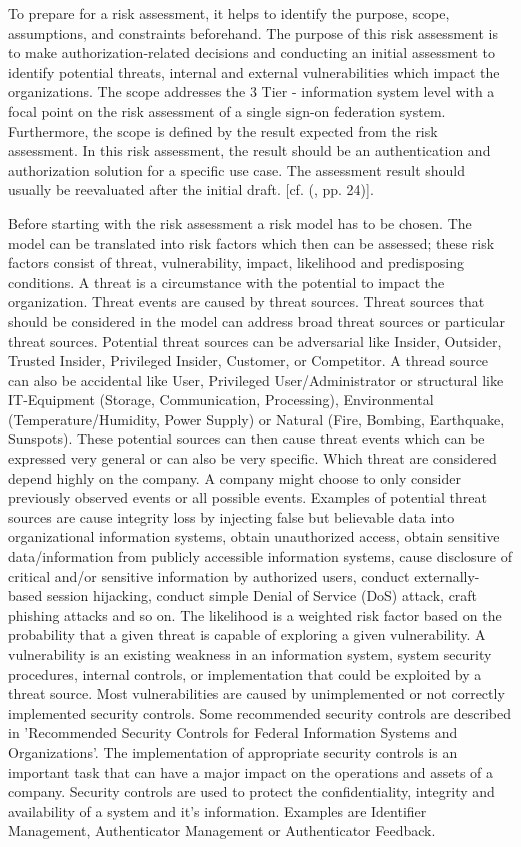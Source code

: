 To prepare for a risk assessment, it helps to identify the purpose, scope, assumptions, and constraints beforehand. The purpose of this risk assessment is to make authorization-related decisions and conducting an initial assessment to identify potential threats, internal and external vulnerabilities which impact the organizations. The scope addresses the 3 Tier -  information system level with a focal point on the risk assessment of a single sign-on federation system. Furthermore, the scope is defined by the result expected from the risk assessment. In this risk assessment, the result should be an authentication and authorization solution for a specific use case. The assessment result should usually be reevaluated after the initial draft. [cf. (\cite{NIST:2012:GCRA}, pp. 24)].

Before starting with the risk assessment a risk model has to be chosen. The model can be translated into risk factors which then can be assessed; these risk factors consist of threat, vulnerability, impact, likelihood and predisposing conditions.  A threat is a circumstance with the potential to impact the organization. Threat events are caused by threat sources. Threat sources that should be considered in the model can address broad threat sources or particular threat sources. Potential threat sources can be adversarial like Insider, Outsider, Trusted Insider, Privileged Insider, Customer, or Competitor. A thread source can also be accidental like User, Privileged User/Administrator or structural like IT-Equipment (Storage, Communication, Processing), Environmental (Temperature/Humidity, Power Supply) or Natural (Fire, Bombing, Earthquake, Sunspots). These potential sources can then cause threat events which can be expressed very general or can also be very specific. Which threat are considered depend highly on the company. A company might choose to only consider previously observed events or all possible events. Examples of potential threat sources are cause integrity loss by injecting false but believable data into organizational information systems, obtain unauthorized access, obtain sensitive data/information from publicly accessible information systems, cause disclosure of critical and/or sensitive information by authorized users, conduct externally-based session hijacking, conduct simple Denial of Service (DoS) attack, craft phishing attacks and so on. The likelihood is a weighted risk factor based on the probability that a given threat is capable of exploring a given vulnerability. A vulnerability is an existing weakness in an information system, system security procedures, internal controls, or implementation that could be exploited by a threat source. Most vulnerabilities are caused by unimplemented or not correctly implemented security controls. Some recommended security controls are described in 'Recommended Security Controls for Federal Information Systems and Organizations'. The implementation of appropriate security controls is an important task that can have a major impact on the operations and assets of a company. Security controls are used to protect the confidentiality, integrity and availability of a system and it's information. Examples are Identifier Management, Authenticator Management or Authenticator Feedback. 